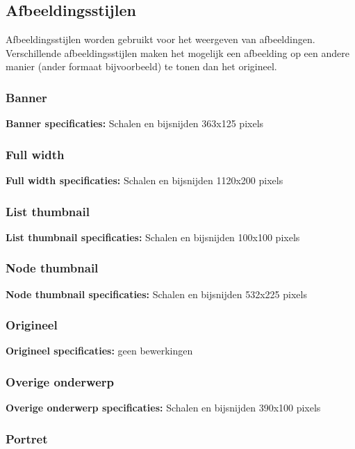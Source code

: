 \subsection{Afbeeldingsstijlen}\label{afbeeldingsstijlen}

Afbeeldingsstijlen worden gebruikt voor het weergeven van afbeeldingen. Verschillende afbeeldingsstijlen maken het mogelijk een afbeelding op een andere manier (ander formaat bijvoorbeeld) te tonen dan het origineel. 

\subsubsection{Banner}

\textbf{Banner specificaties:} Schalen en bijsnijden 363x125 pixels 


\subsubsection{Full width}

\textbf{Full width specificaties:} Schalen en bijsnijden 1120x200 pixels 


\subsubsection{List thumbnail}

\textbf{List thumbnail specificaties:} Schalen en bijsnijden 100x100 pixels 


\subsubsection{Node thumbnail}

\textbf{Node thumbnail specificaties:} Schalen en bijsnijden 532x225 pixels  


\subsubsection{Origineel}

\textbf{Origineel specificaties:} geen bewerkingen 


\subsubsection{Overige onderwerp}

\textbf{Overige onderwerp specificaties:} Schalen en bijsnijden 390x100 pixels  


\subsubsection{Portret}

